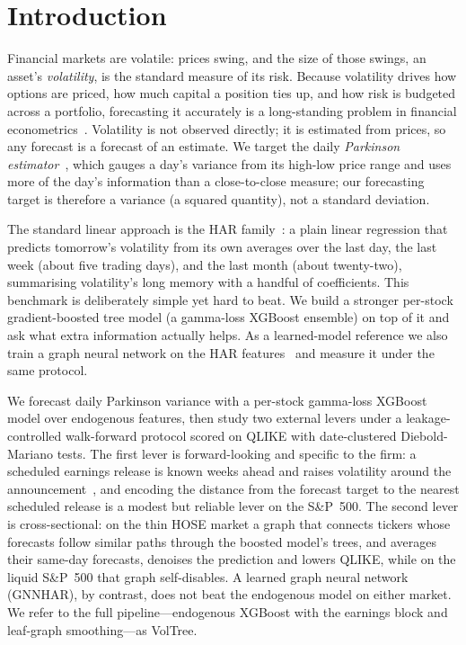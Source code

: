 \documentclass[runningheads]{llncs}
\begin{document}
\section{Introduction}
Financial markets are volatile: prices swing, and the size of those swings, an asset's
\emph{volatility}, is the standard measure of its risk. Because volatility drives how options are
priced, how much capital a position ties up, and how risk is budgeted across a portfolio, forecasting
it accurately is a long-standing problem in financial econometrics~\cite{corsi2009}. Volatility is
not observed directly; it is estimated from prices, so any forecast is a forecast of an estimate. We
target the daily \emph{Parkinson estimator}~\cite{parkinson1980}, which gauges a day's variance from
its high-low price range and uses more of the day's information than a close-to-close measure; our
forecasting target is therefore a variance (a squared quantity), not a standard deviation.

The standard linear approach is the HAR family~\cite{corsi2009}: a plain linear regression that
predicts tomorrow's volatility from its own averages over the last day, the last week (about five
trading days), and the last month (about twenty-two), summarising volatility's long memory with a
handful of coefficients. This benchmark is deliberately simple yet hard to beat. We build a stronger
per-stock gradient-boosted tree model (a gamma-loss XGBoost ensemble) on top of it and ask what extra
information actually helps. As a learned-model reference we also train a graph neural network on the
HAR features~\cite{gnnhar2024} and measure it under the same protocol.

We forecast daily Parkinson variance with a per-stock gamma-loss XGBoost model over endogenous
features, then study two external levers under a leakage-controlled walk-forward protocol scored on
QLIKE with date-clustered Diebold-Mariano tests. The first lever is forward-looking and specific to
the firm: a scheduled earnings release is known weeks ahead and raises volatility around the
announcement~\cite{patell1981}, and encoding the distance from the forecast target to the nearest
scheduled release is a modest but reliable lever on the S\&P~500. The second lever is cross-sectional: on the
thin HOSE market a graph that connects tickers whose forecasts follow similar paths through the boosted
model's trees, and averages their same-day forecasts, denoises the prediction and lowers QLIKE, while
on the liquid S\&P~500 that graph self-disables. A learned graph neural network (GNNHAR), by contrast,
does not beat the endogenous model on either market. We refer to the full pipeline---endogenous
XGBoost with the earnings block and leaf-graph smoothing---as VolTree.
\end{document}
